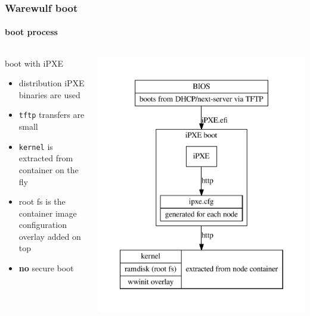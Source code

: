 \documentclass[aspectratio=169]{beamer}
\begin{document}
\begin{frame}[fragile]
\frametitle{Warewulf boot}
\framesubtitle{boot process}
\begin{columns}
\begin{block}{boot with iPXE}
\begin{itemize}
  \item distribution iPXE binaries are used
  \item \texttt{tftp} transfers are small
  \item \texttt{kernel} is extracted from container on the fly
  \item root fs is the container image\\
  configuration overlay added on top
  \item \textbf{no} secure boot
\end{itemize}
\end{block}
\includegraphics[width=.9\linewidth]{ipxe_boot}
\end{columns}
\end{frame}
%
%
%
%
\end{document}
